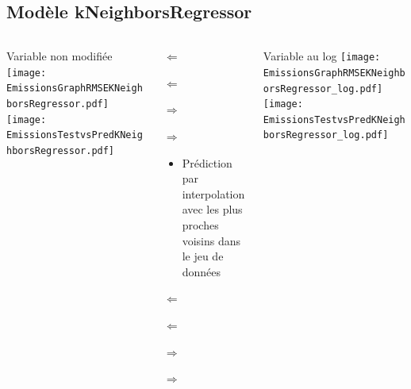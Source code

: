 \documentclass[8pt,aspectratio=169,hyperref={unicode=true}]{beamer}
\begin{document}
\subsection{Modèle kNeighborsRegressor}
\begin{frame}{\insertsubsection}
  \begin{columns}[t]
    \begin{column}{.33\textwidth}
      \centering Variable non modifiée
      \texttt{[image: EmissionsGraphRMSEKNeighborsRegressor.pdf]}
      \texttt{[image: EmissionsTestvsPredKNeighborsRegressor.pdf]}
    \end{column}
    \begin{column}{.33\textwidth}
       $\Longleftarrow$

      {\footnotesize
      }

      \raggedright
      $\Longleftarrow$

      \raggedleft
      $\Longrightarrow$
      
      {\footnotesize
      }

      \raggedleft
      $\Longrightarrow$

      \raggedright
      \begin{itemize}
        \item Prédiction par interpolation avec les plus proches voisins dans le jeu de données
      \end{itemize}

      $\Longleftarrow$
      {\scriptsize \centering
          }

      $\Longleftarrow$

      \raggedleft
      $\Longrightarrow$

      {\scriptsize \centering
          
        }
      \raggedleft
      $\Longrightarrow$
    \end{column}
    \begin{column}{.33\textwidth}
      \centering Variable au log
      \texttt{[image: EmissionsGraphRMSEKNeighborsRegressor\_log.pdf]}
      \texttt{[image: EmissionsTestvsPredKNeighborsRegressor\_log.pdf]}
    \end{column}
  \end{columns}
\end{frame}
\end{document}
